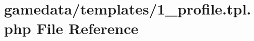 \hypertarget{1__profile_8tpl_8php}{\section{gamedata/templates/1\+\_\+profile.tpl.\+php File Reference}
\label{1__profile_8tpl_8php}
}
